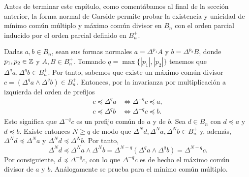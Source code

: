 \documentclass[TFG.tex]{subfiles}
\begin{document}

Antes de terminar este capítulo, como comentábamos al final de la sección anterior, la forma normal de Garside permite probar la existencia y unicidad de mínimo común múltiplo y máximo común divisor en $B_n$ con el orden parcial inducido por el orden parcial definido en $B_n^+$.  

Dadas $a,b\in B_n$, sean sus formas normales $a=\Delta^{p_1}A$ y $b=\Delta^{p_2}B$, donde $p_1,p_2\in\mathbb{Z}$ y $A,B\in B_n^+$. Tomando $q=\max\{|p_1|,|p_2|\}$ tenemos que $\Delta^qa,\Delta^qb\in B_n^+$. Por tanto, sabemos que existe un máximo común divisor $c=(\Delta^qa\land\Delta^qb)\in B_n^+$. Entonces, por la invarianza por multiplicación a izquierda del orden de prefijos
\begin{align*}
c\preccurlyeq \Delta^qa &\Leftrightarrow\Delta^{-q}c\preccurlyeq a,\\
c\preccurlyeq \Delta^qb &\Leftrightarrow\Delta^{-q}c\preccurlyeq b.
\end{align*}
Esto significa que $\Delta^{-q}c$ es un prefijo común de $a$ y de $b$. Sea $d\in B_n$ con $d\preccurlyeq a$ y $d\preccurlyeq b$. Existe entonces $N\geq q$ de modo que $\Delta^N d, \Delta^Na, \Delta^N b\in B_n^+$ y, además, $\Delta^N d \preccurlyeq\Delta^Na$ y $\Delta^N d \preccurlyeq\Delta^Nb$. Por tanto, 
$$\Delta^Nd\preccurlyeq \Delta^N a\land\Delta^N b=\Delta^{N-q}(\Delta^qa\land \Delta^qb)=\Delta^{N-q}c.$$
Por consiguiente, $d\preccurlyeq \Delta^{-q}c$, con lo que $\Delta^{-q}c$ es de hecho el máximo común divisor de $a$ y $b$. Análogamente se prueba para el mínimo común múltiplo. 


\end{document}
